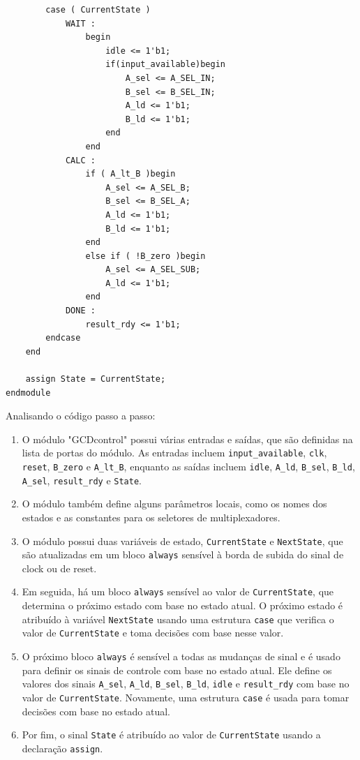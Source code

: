 \documentclass[a4paper,11pt]{article} %
\begin{document}
\begin{verbatim}
        case ( CurrentState )
            WAIT :
                begin
                    idle <= 1'b1; 
                    if(input_available)begin
                        A_sel <= A_SEL_IN;
                        B_sel <= B_SEL_IN;
                        A_ld <= 1'b1;   
                        B_ld <= 1'b1;
                    end
                end
            CALC :
                if ( A_lt_B )begin
                    A_sel <= A_SEL_B;
                    B_sel <= B_SEL_A;
                    A_ld <= 1'b1;
                    B_ld <= 1'b1;
                end
                else if ( !B_zero )begin
                    A_sel <= A_SEL_SUB;
                    A_ld <= 1'b1;
                end
            DONE : 
                result_rdy <= 1'b1;
        endcase
    end

    assign State = CurrentState;
endmodule
\end{verbatim}


Analisando o código passo a passo:

\begin{enumerate}
    \item O módulo "GCDcontrol" possui várias entradas e saídas, que são definidas na lista de portas do módulo.
    As entradas incluem \texttt{input\_available}, \texttt{clk}, \texttt{reset}, \texttt{B\_zero} e \texttt{A\_lt\_B}, enquanto as saídas incluem \texttt{idle}, \texttt{A\_ld}, \texttt{B\_sel}, \texttt{B\_ld}, \texttt{A\_sel}, \texttt{result\_rdy} e \texttt{State}.
    \item O módulo também define alguns parâmetros locais, como os nomes dos estados e as constantes para os seletores de multiplexadores.
    \item O módulo possui duas variáveis de estado, \texttt{CurrentState} e \texttt{NextState}, que são atualizadas em um bloco \texttt{always} sensível à borda de subida do sinal de clock ou de reset.
    \item Em seguida, há um bloco \texttt{always} sensível ao valor de \texttt{CurrentState}, que determina o próximo estado com base no estado atual. O próximo estado é atribuído à variável \texttt{NextState} usando uma estrutura \texttt{case} que verifica o valor de \texttt{CurrentState} e toma decisões com base nesse valor.
    \item O próximo bloco \texttt{always} é sensível a todas as mudanças de sinal e é usado para definir os sinais de controle com base no estado atual. Ele define os valores dos sinais \texttt{A\_sel}, \texttt{A\_ld}, \texttt{B\_sel}, \texttt{B\_ld}, \texttt{idle} e \texttt{result\_rdy} com base no valor de \texttt{CurrentState}. Novamente, uma estrutura \texttt{case} é usada para tomar decisões com base no estado atual.
    \item Por fim, o sinal \texttt{State} é atribuído ao valor de \texttt{CurrentState} usando a declaração \texttt{assign}.
\end{enumerate}
\end{document}

